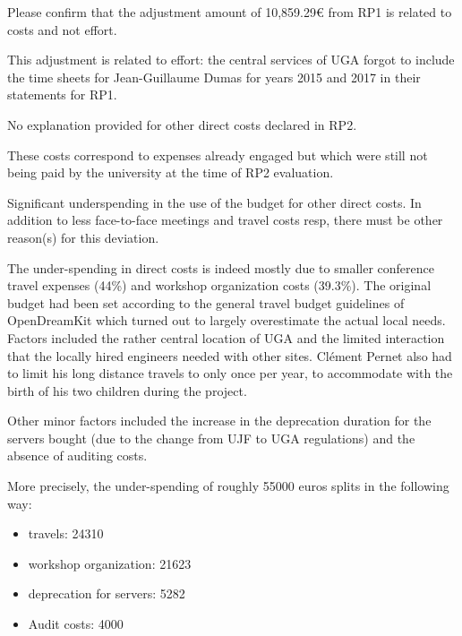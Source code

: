 \begin{EUcomment}
  Please confirm that the adjustment amount of 10,859.29€ from RP1 is
  related to costs and not effort.
\end{EUcomment}
This adjustment is related to effort: the central services of UGA
forgot to include the time sheets for Jean-Guillaume Dumas for years
2015 and 2017 in their statements for RP1.

\begin{EUcomment}
  No explanation provided for other direct costs declared in RP2.
\end{EUcomment}
These costs correspond to expenses already engaged but which were still not being paid by the university at
the time of RP2 evaluation.

\begin{EUcomment}
  Significant underspending in the use of the budget for other direct
  costs. In addition to less face-to-face meetings and travel costs
  resp, there must be other reason(s) for this deviation.
\end{EUcomment}

The under-spending in direct costs is indeed mostly due to smaller
conference travel expenses (44\%) and workshop organization costs
(39.3\%). The original budget had been set according to the general
travel budget guidelines of OpenDreamKit which turned out to largely
overestimate the actual local needs. Factors included the rather
central location of UGA and the limited interaction that the locally
hired engineers needed with other sites. Cl\'ement Pernet also had to
limit his long distance travels to only once per year, to accommodate
with the birth of his two children during the project.

Other minor factors included the increase in the deprecation duration for the
servers bought (due to the change from UJF to UGA regulations) and the absence of auditing costs.

More precisely, the under-spending of roughly 55000 euros splits in the following way:

\begin{itemize}
\item travels: 24310
\item workshop organization: 21623
\item deprecation for servers: 5282
\item Audit costs: 4000
\end{itemize}

\subsubsection{}

